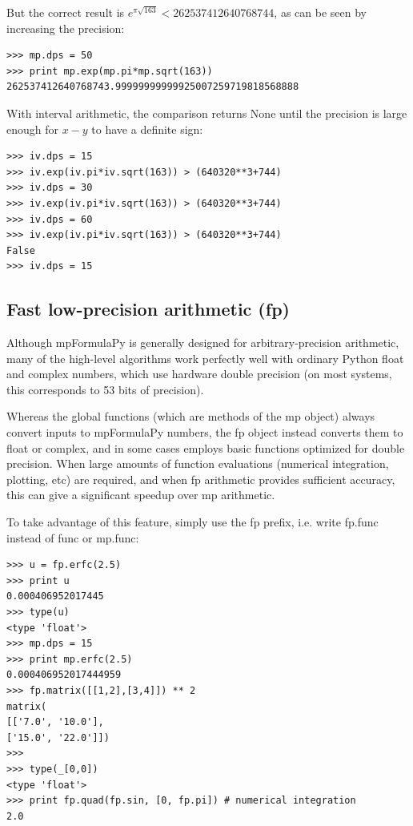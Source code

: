 But the correct result is $e^{\pi\sqrt{163}} < 262537412640768744$, as can be seen by increasing the precision:

\begin{lstlisting}
>>> mp.dps = 50
>>> print mp.exp(mp.pi*mp.sqrt(163))
262537412640768743.99999999999925007259719818568888
\end{lstlisting}


With interval arithmetic, the comparison returns None until the precision is large enough for $x-y$ to have a definite sign:

\begin{lstlisting}
>>> iv.dps = 15
>>> iv.exp(iv.pi*iv.sqrt(163)) > (640320**3+744)
>>> iv.dps = 30
>>> iv.exp(iv.pi*iv.sqrt(163)) > (640320**3+744)
>>> iv.dps = 60
>>> iv.exp(iv.pi*iv.sqrt(163)) > (640320**3+744)
False
>>> iv.dps = 15
\end{lstlisting}


\subsection{Fast low-precision arithmetic (fp)}  

Although mpFormulaPy is generally designed for arbitrary-precision arithmetic, many of the high-level algorithms work perfectly well with ordinary Python float and complex numbers, which use hardware double precision (on most systems, this corresponds to 53 bits of precision). 

Whereas the global functions (which are methods of the mp object) always
convert inputs to mpFormulaPy numbers, the fp object instead converts them to float or complex, and in some cases employs basic functions optimized for double precision. When large amounts of function evaluations (numerical integration, plotting, etc) are required, and when
fp arithmetic provides sufficient accuracy, this can give a significant speedup over mp arithmetic.

\vpara
To take advantage of this feature, simply use the fp prefix, i.e. write fp.func instead of func or mp.func:

\begin{lstlisting}
>>> u = fp.erfc(2.5)
>>> print u
0.000406952017445
>>> type(u)
<type 'float'>
>>> mp.dps = 15
>>> print mp.erfc(2.5)
0.000406952017444959
>>> fp.matrix([[1,2],[3,4]]) ** 2
matrix(
[['7.0', '10.0'],
['15.0', '22.0']])
>>>
>>> type(_[0,0])
<type 'float'>
>>> print fp.quad(fp.sin, [0, fp.pi]) # numerical integration
2.0
\end{lstlisting}



